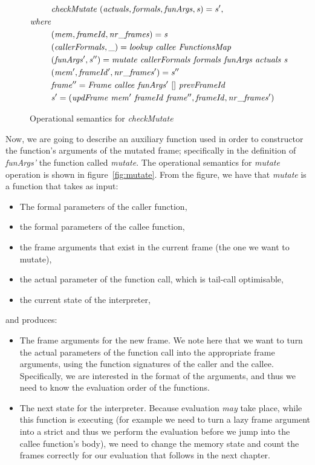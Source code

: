 \documentclass[diploma]{softlab-thesis}
\begin{document}
 

\begin{figure}[h]
  \begin{align*}
    & \mathit{checkMutate \hfill\ (actuals, formals, funArgs, s) = s', } \\
    \mathit{where } \\
    & \mathit{(mem, frameId, nr\_frames) = s} \\
    & \mathit{(callerFormals, \_) = lookup \hfill\ callee \hfill\ FunctionsMap} \\
    & \mathit{(funArgs', s'') = mutate \hfill\ callerFormals \hfill\ formals \hfill\ funArgs \hfill\ actuals \hfill\ s } \\
    & \mathit{(mem', frameId', nr\_frames') = s''} \\
    & \mathit{frame'' = Frame \hfill\ callee \hfill\ funArgs' \hfill\ [] \hfill\ prevFrameId} \\
    & \mathit{s' = (updFrame \hfill\ mem' \hfill\ frameId \hfill\ frame'', frameId, nr\_frames')}
  \end{align*}
\caption{Operational semantics for \textit{checkMutate}\label{fig:checkMutate}}
\end{figure}

Now, we are going to describe an auxiliary function used in order to constructor 
the function's arguments of the mutated frame; specifically in the definition of 
\textit{funArgs'} the function called \textit{mutate}.
The operational semantics for \textit{mutate} operation is shown in figure~\ref{fig:mutate}.
From the figure, we have that \textit{mutate} is a function that takes as input:
\begin{itemize}
  \item The formal parameters of the caller function,
  \item the formal parameters of the callee function,
  \item the frame arguments that exist in the current frame (the one we want to mutate),
  \item the actual parameter of the function call, which is tail-call optimisable,
  \item the current state of the interpreter, 
\end{itemize}
and produces:
\begin{itemize}
  \item The frame arguments for the new frame. We note here that we want to turn the actual parameters 
  of the function call into the appropriate frame arguments, using the function signatures of the caller and the callee.
  Specifically, we are interested in the format of the arguments, and thus we need to know the evaluation 
  order of the functions.
  \item The next state for the interpreter. Because evaluation \textit{may} take place, while this function is executing 
  (for example we need to turn a lazy frame argument into a strict and thus we perform the evaluation before 
  we jump into the callee function's body), we need to change the memory state and count the frames correctly
  for our evaluation that follows in the next chapter.
\end{itemize}
\end{document}
